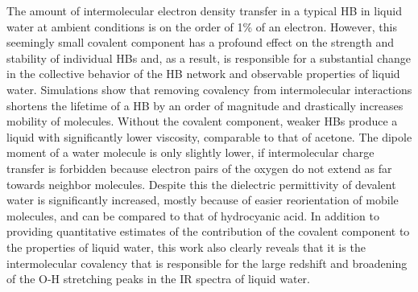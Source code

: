 \documentclass[aps,prl,reprint,amsmath,amssymb]{revtex4-1}
\begin{document}
The amount of intermolecular electron density transfer in a typical HB in liquid water at ambient conditions is on the order of 1\% of an electron. However, this seemingly small covalent component has a profound effect on the strength and stability of individual HBs and, as a result, is responsible for a substantial change in the collective behavior of the HB network and observable properties of liquid water. Simulations show that removing covalency from intermolecular interactions shortens the lifetime of a HB by an order of magnitude and drastically increases mobility of molecules. Without the covalent component, weaker HBs produce a liquid with significantly lower viscosity, comparable to that of acetone. The dipole moment of a water molecule is only slightly lower, if intermolecular charge transfer is forbidden because electron pairs of the oxygen do not extend as far towards neighbor molecules. Despite this the dielectric permittivity of devalent water is significantly increased, mostly because of easier reorientation of mobile molecules, and can be compared to that of hydrocyanic acid. In addition to providing quantitative estimates of the contribution of the covalent component to the properties of liquid water, this work also clearly reveals that it is the intermolecular covalency that is responsible for the large redshift and broadening of the O-H stretching peaks in the IR spectra of liquid water. %


\end{document}
